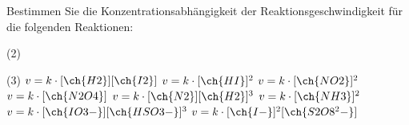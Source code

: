 \documentclass[DIV11]{scrartcl}
\begin{document}
\begin{question}[name=Abhängigkeit von der Konzentration]
Bestimmen Sie die Konzentrationsabhängigkeit der Reaktionsgeschwindigkeit für die
folgenden Reaktionen:
\begin{tasks}(2)
 \task {}
 \task {}
 \task {}
 \task {}
 \task {}
 \task {}
 \task {}
 \task {}
\end{tasks}
\end{question}
\begin{solution}
\begin{tasks}(3)
 \task $v=k\cdot[\ch{H2}][\ch{I2}]$
 \task $v=k\cdot[\ch{HI}]^2$
 \task $v=k\cdot[\ch{NO2}]^2$
 \task $v=k\cdot[\ch{N2O4}]$
 \task $v=k\cdot[\ch{N2}][\ch{H2}]^3$
 \task $v=k\cdot[\ch{NH3}]^2$
 \task $v=k\cdot[\ch{IO3-}][\ch{HSO3-}]^3$
 \task $v=k\cdot[\ch{I-}]^2[\ch{S2O8^2-}]$
\end{tasks}
\end{solution}
\end{document}
